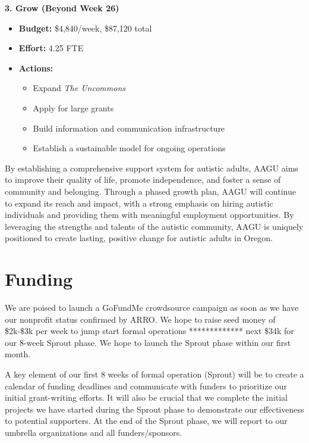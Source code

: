 \documentclass[
  letterpaper,
  DIV=11,
  numbers=noendperiod]{scrreprt}
\providecommand{\tightlist}{%
  \setlength{\itemsep}{0pt}\setlength{\parskip}{0pt}}\usepackage{longtable,booktabs,array}
\begin{document}
\textbf{3. Grow (Beyond Week 26)}

\begin{itemize}
\tightlist
\item
  \textbf{Budget:} \$4,840/week, \$87,120 total
\item
  \textbf{Effort:} 4.25 FTE
\item
  \textbf{Actions:}

  \begin{itemize}
  \tightlist
  \item
    Expand \emph{The Uncommons}
  \item
    Apply for large grants
  \item
    Build information and communication infrastructure
  \item
    Establish a sustainable model for ongoing operations
  \end{itemize}
\end{itemize}

By establishing a comprehensive support system for autistic adults, AAGU
aims to improve their quality of life, promote independence, and foster
a sense of community and belonging. Through a phased growth plan, AAGU
will continue to expand its reach and impact, with a strong emphasis on
hiring autistic individuals and providing them with meaningful
employment opportunities. By leveraging the strengths and talents of the
autistic community, AAGU is uniquely positioned to create lasting,
positive change for autistic adults in Oregon.


\chapter{Funding}\label{funding}

We are poised to launch a GoFundMe crowdsource campaign as soon as we
have our nonprofit status confirmed by ARRO. We hope to raise seed money
of \$2k-\$3k per week to jump start formal operations ************* next
\$34k for our 8-week Sprout phase. We hope to launch the Sprout phase
within our first month.

A key element of our first 8 weeks of formal operation (Sprout) will be
to create a calendar of funding deadlines and communicate with funders
to prioritize our initial grant-writing efforts. It will also be crucial
that we complete the initial projects we have started during the Sprout
phase to demonstrate our effectiveness to potential supporters. At the
end of the Sprout phase, we will report to our umbrella organizations
and all funders/sponsors.
\end{document}

